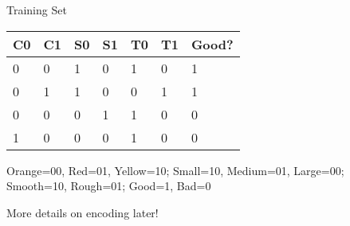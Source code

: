 \documentclass[usenames,dvipsnames]{beamer}
\begin{document}
\begin{frame}{Training Set}
\begin{table}[]
	\begin{tabular}{|l|l||l|l||l|l||l|}
		\hline 
		\rowcolor{white}
		\cellcolor{Lavender}\textbf{C0} & \cellcolor{Lavender}\textbf{C1} & \cellcolor{Lavender}\textbf{S0} & \cellcolor{Lavender}\textbf{S1} & \cellcolor{Lavender}\textbf{T0} & \cellcolor{Lavender}\textbf{T1} & \cellcolor{Tan}\textbf{Good?} \\ \hline 
		\cellcolor{Lavender}0 & \cellcolor{Lavender}0 & \cellcolor{Lavender}1 & \cellcolor{Lavender}0 & \cellcolor{Lavender}1 & \cellcolor{Lavender}0 & \cellcolor{Tan}1 \\
		\cellcolor{Lavender}0 & \cellcolor{Lavender}1 & \cellcolor{Lavender}1 & \cellcolor{Lavender}0 & \cellcolor{Lavender}0 & \cellcolor{Lavender}1 & \cellcolor{Tan}1 \\
		\cellcolor{Lavender}0 & \cellcolor{Lavender}0 & \cellcolor{Lavender}0 & \cellcolor{Lavender}1 & \cellcolor{Lavender}1 & \cellcolor{Lavender}0 & \cellcolor{Tan}0 \\
		\cellcolor{Lavender}1 & \cellcolor{Lavender}0 & \cellcolor{Lavender}0 & \cellcolor{Lavender}0 & \cellcolor{Lavender}1 & \cellcolor{Lavender}0 & \cellcolor{Tan}0 \\ \hline 
	\end{tabular}
\end{table}

\pause Orange=00, Red=01, Yellow=10; Small=10, Medium=01, Large=00; Smooth=10, Rough=01; Good=1, Bad=0

More details on encoding later!
\end{frame}
\end{document}

